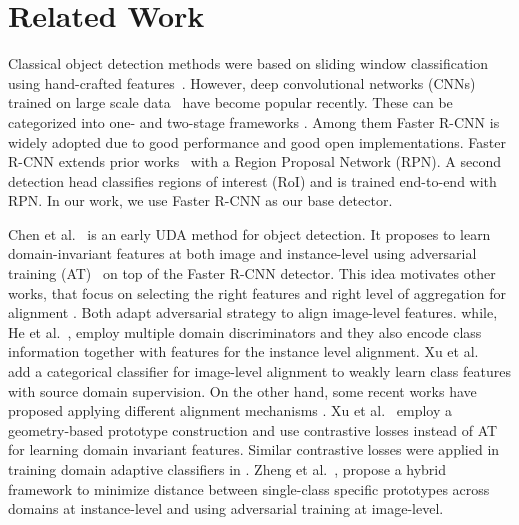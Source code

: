 \documentclass[10pt,twocolumn,letterpaper]{article}
\begin{document}
\section{Related Work}
\label{sec:related}
 Classical object detection methods were based on sliding window classification using hand-crafted features~\cite{dalal2005histograms, viola2001rapid, felzenszwalb2009object}. 
However, deep convolutional networks (CNNs)~\cite{krizhevsky2017imagenet, he2016deep, simonyan2014very} trained on large scale data~\cite{Chen2015, pascal} have become popular recently. 
These can be categorized into one- \cite{liu2016ssd, redmon2016you,redmon2017yolo9000} and two-stage frameworks \cite{girshick2014rich, girshick2015fast, he2015spatial, ren2015faster}. Among them Faster R-CNN \cite{ren2015faster} is widely adopted due to good performance and good open implementations. 
Faster R-CNN extends prior works~\cite{girshick2014rich, girshick2015fast} with a Region Proposal Network (RPN). 
A second detection head classifies regions of interest (RoI) and is trained end-to-end with RPN. In our work, we use Faster R-CNN as our base detector. 


 Chen et al.\ \cite{da_faster_rcnn} is an early UDA method for object detection. It proposes to learn domain-invariant features at both image and instance-level using adversarial training (AT)~\cite{grl_ganin} on top of the Faster R-CNN detector.
This idea motivates other works, that focus on selecting the right features and right level of aggregation for alignment \cite{strong-weak, he_iccv19_MAF, zhu_cvpr19_selective_alignment, xu_cvpr20_icr_ccr, chen_cvpr20_htcn}. Both \cite{strong-weak, he_iccv19_MAF} adapt adversarial strategy to align image-level features.
while, He et al.\ \cite{he_iccv19_MAF}, employ multiple domain discriminators and they also encode class information together with features for the instance level alignment. 
Xu et al.\ \cite{xu_cvpr20_icr_ccr} add a categorical classifier for image-level alignment to weakly learn class features with source domain supervision. On the other hand, some recent works have proposed applying different alignment mechanisms \cite{ zhuang_2020_ifan, zheng_cvpr20_prototype, GPA}. Xu et al.\ \cite{GPA} employ a geometry-based prototype construction and use contrastive losses instead of AT for learning domain invariant features. 
Similar contrastive losses were applied in training domain adaptive classifiers in \cite{kang2019contrastive}.
Zheng et al.\ \cite{zheng_cvpr20_prototype}, propose a hybrid framework to minimize  distance between single-class specific prototypes across domains at instance-level and using adversarial training at image-level.
\end{document}
